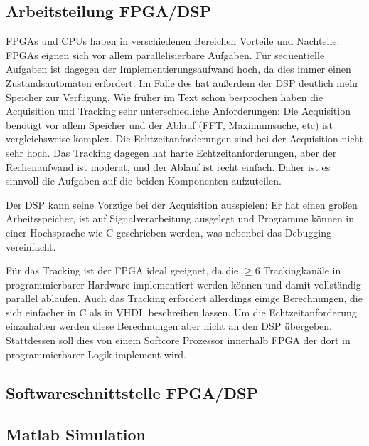 \subsection{Arbeitsteilung FPGA/DSP}
FPGAs und CPUs haben in verschiedenen Bereichen Vorteile und Nachteile: FPGAs eignen sich vor allem parallelisierbare Aufgaben. Für sequentielle Aufgaben ist dagegen der Implementierungsaufwand hoch, da dies immer einen Zustandsautomaten erfordert. Im Falle des \comboard hat außerdem der DSP deutlich mehr Speicher zur Verfügung. Wie früher im Text schon besprochen haben die Acquisition und Tracking sehr unterschiedliche Anforderungen: Die Acquisition benötigt vor allem Speicher und der Ablauf (FFT, Maximumsuche, etc) ist vergleichsweise komplex. Die Echtzeitanforderungen sind bei der Acquisition nicht sehr hoch. Das Tracking dagegen hat harte Echtzeitanforderungen, aber der Rechenaufwand ist moderat, und der Ablauf ist recht einfach. Daher ist es sinnvoll die Aufgaben auf die beiden Komponenten aufzuteilen.

Der DSP kann seine Vorzüge bei der Acquisition ausspielen: Er hat einen großen Arbeitsspeicher, ist auf Signalverarbeitung ausgelegt und Programme können in einer Hochsprache wie C geschrieben werden, was nebenbei das Debugging vereinfacht.

Für das Tracking ist der FPGA ideal geeignet, da die $\geq 6$ Trackingkanäle in programmierbarer Hardware implementiert werden können und damit vollständig parallel ablaufen. Auch das Tracking erfordert allerdings einige Berechnungen, die sich einfacher in C als in VHDL beschreiben lassen. Um die Echtzeitanforderung einzuhalten werden diese Berechnungen aber nicht an den DSP übergeben. Stattdessen soll dies von einem Softcore Prozessor innerhalb FPGA der dort in programmierbarer Logik implement wird.



\subsection{Softwareschnittstelle FPGA/DSP}

\subsection{Matlab Simulation}

